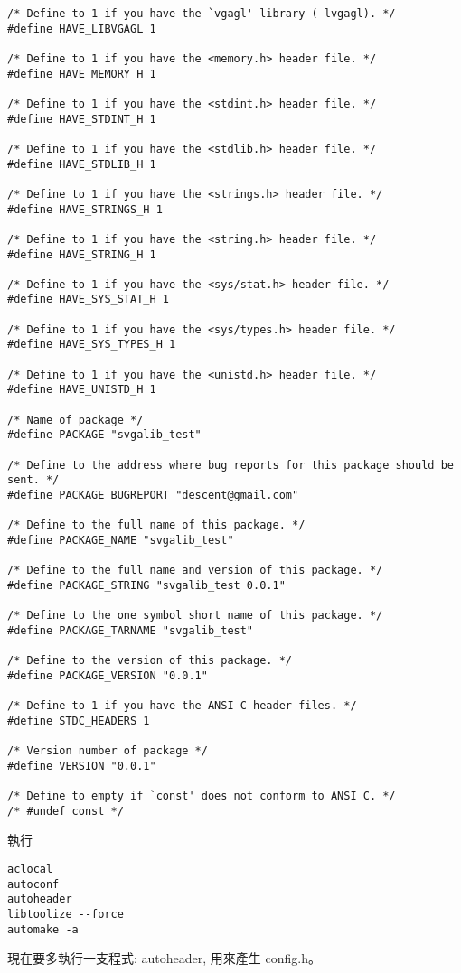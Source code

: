 \documentclass[12pt,a4]{article}
\begin{document}
\begin{CJK}{UTF8}{bsmi}
\begin{verbatim}
/* Define to 1 if you have the `vgagl' library (-lvgagl). */
#define HAVE_LIBVGAGL 1

/* Define to 1 if you have the <memory.h> header file. */
#define HAVE_MEMORY_H 1

/* Define to 1 if you have the <stdint.h> header file. */
#define HAVE_STDINT_H 1

/* Define to 1 if you have the <stdlib.h> header file. */
#define HAVE_STDLIB_H 1

/* Define to 1 if you have the <strings.h> header file. */
#define HAVE_STRINGS_H 1

/* Define to 1 if you have the <string.h> header file. */
#define HAVE_STRING_H 1

/* Define to 1 if you have the <sys/stat.h> header file. */
#define HAVE_SYS_STAT_H 1

/* Define to 1 if you have the <sys/types.h> header file. */
#define HAVE_SYS_TYPES_H 1

/* Define to 1 if you have the <unistd.h> header file. */
#define HAVE_UNISTD_H 1

/* Name of package */
#define PACKAGE "svgalib_test"

/* Define to the address where bug reports for this package should be sent. */
#define PACKAGE_BUGREPORT "descent@gmail.com"

/* Define to the full name of this package. */
#define PACKAGE_NAME "svgalib_test"

/* Define to the full name and version of this package. */
#define PACKAGE_STRING "svgalib_test 0.0.1"

/* Define to the one symbol short name of this package. */
#define PACKAGE_TARNAME "svgalib_test"

/* Define to the version of this package. */
#define PACKAGE_VERSION "0.0.1"

/* Define to 1 if you have the ANSI C header files. */
#define STDC_HEADERS 1

/* Version number of package */
#define VERSION "0.0.1"

/* Define to empty if `const' does not conform to ANSI C. */
/* #undef const */
\end{verbatim}


執行
\begin{verbatim}
aclocal
autoconf
autoheader
libtoolize --force 
automake -a
\end{verbatim}

現在要多執行一支程式: autoheader, 用來產生 config.h。



\end{CJK}
\end{document}
